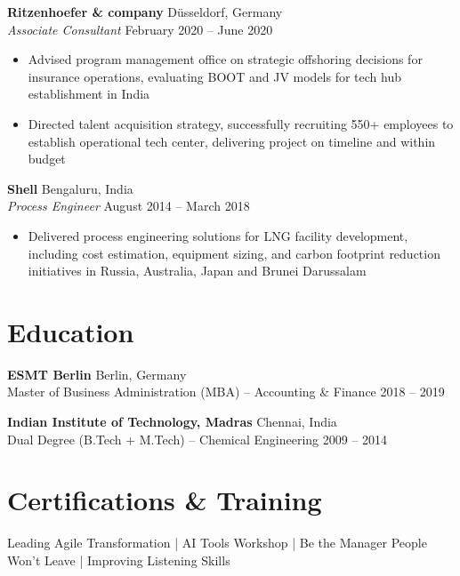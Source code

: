 \documentclass[10pt,a4paper]{article}
\begin{document}
\vspace{3pt}

\textbf{Ritzenhoefer \& company} \hfill Düsseldorf, Germany\\
\textit{Associate Consultant} \hfill February 2020 -- June 2020
\begin{itemize}
    \item Advised program management office on strategic offshoring decisions for insurance operations, evaluating BOOT and JV models for tech hub establishment in India
    \item Directed talent acquisition strategy, successfully recruiting 550+ employees to establish operational tech center, delivering project on timeline and within budget
\end{itemize}

\vspace{3pt}

\textbf{Shell} \hfill Bengaluru, India\\
\textit{ Process Engineer} \hfill August 2014 -- March 2018
\begin{itemize}
    \item Delivered process engineering solutions for LNG facility development, including cost estimation, equipment sizing, and carbon footprint reduction initiatives in Russia, Australia, Japan and Brunei Darussalam 
\end{itemize}

\vspace{3pt}

\section*{Education}

\textbf{ESMT Berlin} \hfill Berlin, Germany\\
Master of Business Administration (MBA) -- Accounting \& Finance \hfill 2018 -- 2019

\textbf{Indian Institute of Technology, Madras} \hfill Chennai, India\\
Dual Degree (B.Tech + M.Tech) -- Chemical Engineering \hfill 2009 -- 2014

\vspace{3pt}

\section*{Certifications \& Training}
Leading Agile Transformation | AI Tools Workshop | Be the Manager People Won't Leave | Improving Listening Skills
\end{document}
